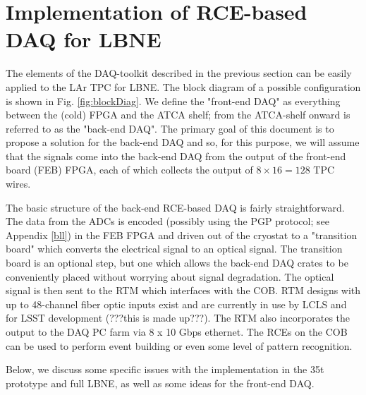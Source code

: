 \section{Implementation of RCE-based DAQ for LBNE}


The elements of the DAQ-toolkit described in the previous section can be easily applied to the LAr TPC for LBNE.  The block diagram of a possible configuration is shown in Fig. \ref{fig:blockDiag}.  We define the "front-end DAQ" as everything between the (cold) FPGA and the ATCA shelf; from the ATCA-shelf onward is referred to as the "back-end DAQ".    The primary goal of this document is to propose a solution for the back-end DAQ and so, for this purpose, we will assume that the signals come into the back-end DAQ from the output of the front-end board (FEB) FPGA, each of which collects the output of  $8\times 16 = 128$ TPC wires.  

The basic structure of the back-end RCE-based DAQ is fairly straightforward.  The data from the ADCs is encoded (possibly using the PGP protocol; see Appendix \ref{bll}) in the FEB FPGA and driven out of the cryostat to a  "transition board" which converts the electrical signal to an optical signal.  The transition board is an optional step, but one which allows the back-end DAQ crates to be conveniently placed without worrying about signal degradation.   The optical signal is then sent to the RTM which interfaces with the COB.  RTM designs with up to 48-channel fiber optic inputs exist and are currently in use by LCLS and for LSST development (???this is made up???).  The RTM also incorporates the output to the DAQ PC farm via 8 x 10 Gbps ethernet.  The RCEs on the COB can be used to perform event building or even some level of pattern recognition. 

Below, we discuss some specific issues with the implementation in the 35t prototype and full LBNE, as well as some ideas for the front-end DAQ.   



